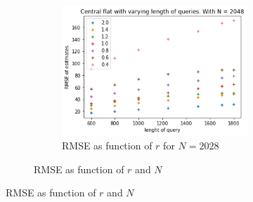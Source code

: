 \documentclass[11pt]{article}
\theoremstyle{definition}
\begin{document}
\begin{figure}[H]
\begin{subfigure}{.4\textwidth}
\begin{subfigure}{\textwidth}
  \includegraphics[width=\linewidth]{figures/central_flat/varying_r/cen_flat_varying_length_N=2048.png}
  \caption{RMSE as function of $r$ for $N=2028$}
  \label{fig:5}
\end{subfigure}
\caption{RMSE as function of $r$ and $N$}
\label{fig:6}
\end{subfigure}
\caption{RMSE as function of $r$ and $N$}
\label{fig:7}
\end{figure}
\end{document}
